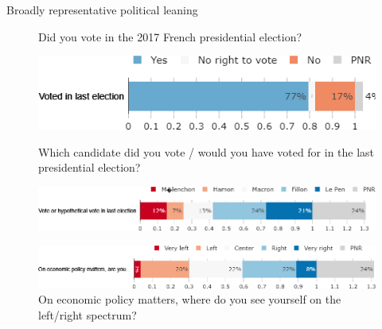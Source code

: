 \begin{framefont}{\small}
\begin{frame}{Broadly representative political leaning}%
\vspace{-.5cm}
\begin{figure}[h!]
\caption{Did you vote in the 2017 French presidential election?}
\includegraphics[width=.45\paperwidth]{../figures/FR/vote_participation_FR.png} \\
\vspace{.1cm}
\caption{Which candidate did you vote / would you have voted for in the last presidential election?}
\includegraphics[width=.7\paperwidth]{../figures/FR/vote_main_FR.png} \\
\caption{On economic policy matters, where do you see yourself on the left/right spectrum?}
\includegraphics[width=.7\paperwidth]{../figures/FR/left_right_FR.png}
\end{figure}
\end{frame}




\end{framefont}
